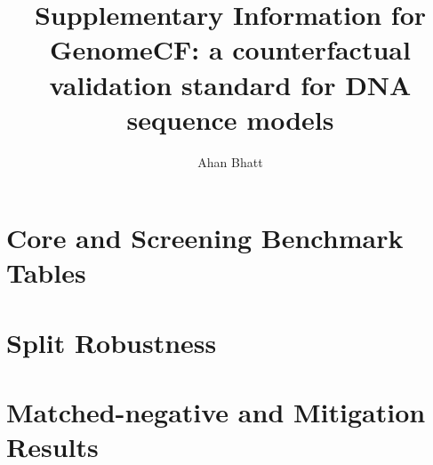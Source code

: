 \documentclass[11pt]{article}
\title{\textbf{Supplementary Information for}\\[0.4em]GenomeCF: a counterfactual validation standard for DNA sequence models}
\author{Ahan Bhatt}
\date{}
\begin{document}
\maketitle
\tableofcontents
\clearpage

\section{Core and Screening Benchmark Tables}

\begin{table}[h]
  \centering
  \caption{GC-only diagnostic baselines on the focal human tasks.}
  \small
  
\end{table}

\begin{landscape}
\begin{table}[p]
  \centering
  \caption{Completed official-split real-data matrix for core and screening tasks.}
  \scriptsize
  \resizebox{\linewidth}{!}{}
\end{table}
\end{landscape}
\clearpage

\section{Split Robustness}

\begin{table}[h]
  \centering
  \caption{Five-fold chromosome-grouped cross-validation summary.}
  \scriptsize
  \resizebox{\textwidth}{!}{}
\end{table}

\begin{landscape}
\begin{table}[p]
  \centering
  \caption{Per-fold chromosome-grouped cross-validation metrics and fold-wise counts.}
  \scriptsize
  \resizebox{\linewidth}{!}{}
\end{table}
\end{landscape}
\clearpage

\section{Matched-negative and Mitigation Results}

\begin{table}[h]
  \centering
  \caption{Matched-negative evaluation on the focal real tasks.}
  \scriptsize
  \resizebox{\textwidth}{!}{}
\end{table}
\end{document}

